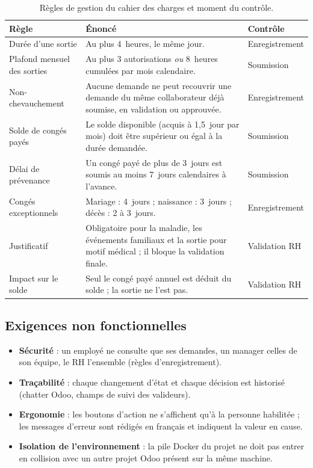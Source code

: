 \documentclass[11pt,a4paper]{article}
\begin{document}
\begin{table}[H]
\centering
\caption{Règles de gestion du cahier des charges et moment du contrôle.}
\label{tab:regles}
\small
\begin{tabularx}{\textwidth}{>{\raggedright\arraybackslash}p{4.3cm} Y l}
\toprule
Règle & Énoncé & Contrôle \\
\midrule
Durée d'une sortie & Au plus 4~heures, le même jour. & Enregistrement \\
Plafond mensuel des sorties & Au plus 3 autorisations \emph{ou} 8~heures cumulées par mois
calendaire. & Soumission \\
Non-chevauchement & Aucune demande ne peut recouvrir une demande du même collaborateur déjà
soumise, en validation ou approuvée. & Enregistrement \\
Solde de congés payés & Le solde disponible (acquis à 1,5~jour par mois) doit être supérieur ou
égal à la durée demandée. & Soumission \\
Délai de prévenance & Un congé payé de plus de 3~jours est soumis au moins 7~jours calendaires à
l'avance. & Soumission \\
Congés exceptionnels & Mariage : 4~jours ; naissance : 3~jours ; décès : 2 à 3~jours. &
Enregistrement \\
Justificatif & Obligatoire pour la maladie, les événements familiaux et la sortie pour motif
médical ; il bloque la validation finale. & Validation RH \\
Impact sur le solde & Seul le congé payé annuel est déduit du solde ; la sortie ne l'est pas. &
Validation RH \\
\bottomrule
\end{tabularx}
\end{table}

\subsection{Exigences non fonctionnelles}
\begin{itemize}
  \item \textbf{Sécurité} : un employé ne consulte que ses demandes, un manager celles de son équipe,
        le RH l'ensemble (règles d'enregistrement).
  \item \textbf{Traçabilité} : chaque changement d'état et chaque décision est historisé (chatter
        Odoo, champs de suivi des valideurs).
  \item \textbf{Ergonomie} : les boutons d'action ne s'affichent qu'à la personne habilitée ; les
        messages d'erreur sont rédigés en français et indiquent la valeur en cause.
  \item \textbf{Isolation de l'environnement} : la pile Docker du projet ne doit pas entrer en
        collision avec un autre projet Odoo présent sur la même machine.
\end{itemize}
\end{document}
